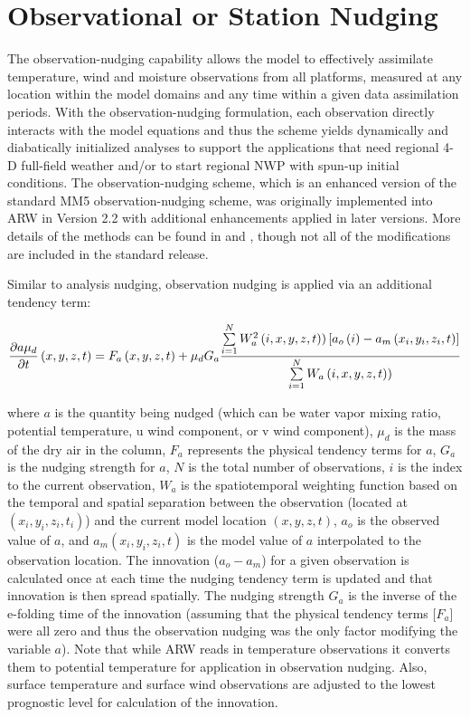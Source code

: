 \section{Observational or Station Nudging}

The observation-nudging capability allows the model to effectively assimilate temperature, wind and moisture observations from all platforms, measured at any location within the model domains and any time within a given data assimilation periods. With the observation-nudging formulation, each observation directly interacts with the model equations and thus the scheme yields dynamically and diabatically initialized analyses to support the applications that need regional 4-D full-field weather and/or to start regional NWP with spun-up initial conditions. The observation-nudging scheme, which is an enhanced version of the standard MM5 observation-nudging scheme, was originally implemented into ARW in Version 2.2 with additional enhancements applied in later versions. More details of the methods can be found in \citet{liu08} and \citet{deng09}, though not all of the modifications are included in the standard release.

Similar to analysis nudging, observation nudging is applied via an additional tendency term:

$$ {\partial a \mu_d \over \partial t}\left( x,y,z,t \right) = F_a\left( x,y,z,t \right) + \mu_d G_a { \sum\limits_{i=1}^{N} W^2_a\left(i,x,y,z,t)\right)\left[a_o\left( i \right) - a_m\left( x_i,y_i,z_i,t\right)\right] \over \sum\limits_{i=1}^{N} W_a\left(i,x,y,z,t)\right)} $$

\noindent
where $a$ is the quantity being nudged (which can be water vapor mixing ratio, potential temperature, u wind component, or v wind component), $\mu_d$ is the mass of the dry air in the column, $F_a$ represents the physical tendency terms for $a$, $G_a$ is the nudging strength for $a$, $N$ is the total number of observations, $i$ is the index to the current observation, $W_a$ is the spatiotemporal weighting function based on the temporal and spatial separation between the observation (located at $(x_i, y_i, z_i, t_i)$) and the current model location $(x, y, z, t)$, $a_o$ is the observed value of $a$, and $a_m(x_i,y_i,z_i,t)$ is the model value of $a$ interpolated to the observation location.  The innovation ($a_o-a_m$) for a given observation is calculated once at each time the nudging tendency term is updated and that innovation is then spread spatially. The nudging strength $G_a$ is the inverse of the e-folding time of the innovation (assuming that the physical tendency terms [$F_a$] were all zero and thus the observation nudging was the only factor modifying the variable $a$).  Note that while ARW reads in temperature observations it converts them to potential temperature for application in observation nudging.  Also, surface temperature and surface wind observations are adjusted to the lowest prognostic level for calculation of the innovation.

